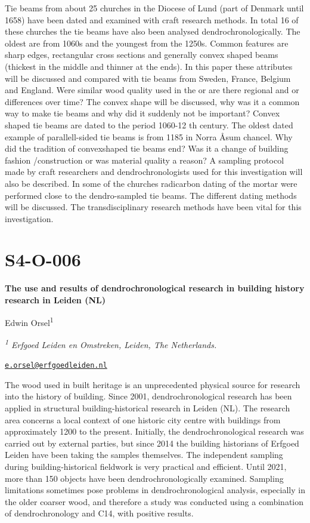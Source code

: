 \documentclass[
]{book}
\begin{document}
Tie beams from about 25 churches in the Diocese of Lund (part of Denmark until 1658) have been dated and examined with craft research methods. In total 16 of these churches the tie beams have also been analysed dendrochronologically. The oldest are from 1060s and the youngest from the 1250s. Common features are sharp edges, rectangular cross sections and generally convex shaped beams (thickest in the middle and thinner at the ends). In this paper these attributes will be discussed and compared with tie beams from Sweden, France, Belgium and England. Were similar wood quality used in the or are there regional and or differences over time? The convex shape will be discussed, why was it a common way to make tie beams and why did it suddenly not be important? Convex shaped tie beams are dated to the period 1060-12 th century. The oldest dated example of parallell-sided tie beams is from 1185 in Norra Åsum chancel. Why did the tradition of convexshaped tie beams end? Was it a change of building fashion /construction or was material quality a reason? A sampling protocol made by craft researchers and dendrochronologists used for this investigation will also be described. In some of the churches radicarbon dating of the mortar were performed close to the dendro-sampled tie beams. The different dating methods will be discussed. The transdisciplinary research methods have been vital for this investigation.

\hypertarget{s4-o-006}{%
\section*{S4-O-006}\label{s4-o-006}}

\textbf{The use and results of dendrochronological research in building history research in Leiden (NL)}

Edwin Orsel\textsuperscript{1}

\emph{\textsuperscript{1} Erfgoed Leiden en Omstreken, Leiden, The Netherlands.}

\href{mailto:e.orsel@erfgoedleiden.nl}{\nolinkurl{e.orsel@erfgoedleiden.nl}}

The wood used in built heritage is an unprecedented physical source for research into the history of building. Since 2001, dendrochronological research has been applied in structural building-historical research in Leiden (NL). The research area concerns a local context of one historic city centre with buildings from approximately 1200 to the present. Initially, the dendrochronological research was carried out by external parties, but since 2014 the building historians of Erfgoed Leiden have been taking the samples themselves. The independent sampling during building-historical fieldwork is very practical and efficient. Until 2021, more than 150 objects have been dendrochronologically examined. Sampling limitations sometimes pose problems in dendrochronological analysis, especially in the older coarser wood, and therefore a study was conducted using a combination of dendrochronology and C14, with positive results.
\end{document}

